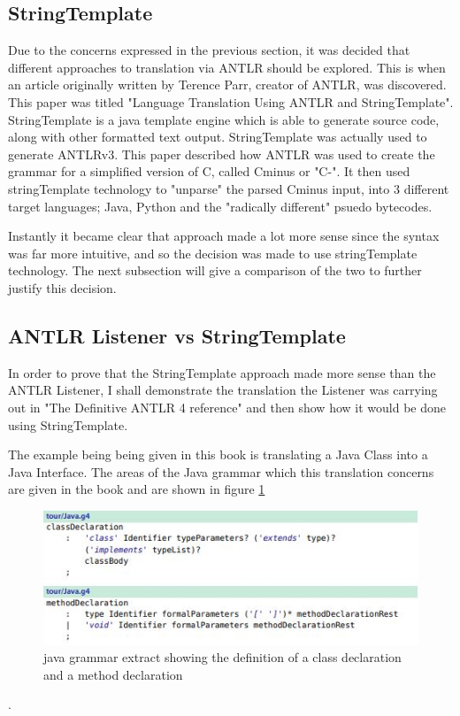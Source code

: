 \documentclass{l4proj}
\begin{document}
\subsection{StringTemplate}
Due to the concerns expressed in the previous section, it was decided that different approaches to translation via ANTLR should be explored. This is when an article originally written by Terence Parr, creator of ANTLR, was discovered. This paper was titled "Language Translation Using ANTLR and StringTemplate". StringTemplate is a java template engine which is able to generate source code, along with other formatted text output. StringTemplate was actually used to generate ANTLRv3. This paper described how ANTLR was used to create the grammar for a simplified version of C, called Cminus or "C-". It then used stringTemplate technology to "unparse" the parsed Cminus input, into 3 different target languages; Java, Python and the "radically different" psuedo bytecodes.

Instantly it became clear that approach made a lot more sense since the syntax was far more intuitive, and so the decision was made to use stringTemplate technology. The next subsection will give a comparison of the two to further justify this decision.

\subsection{ANTLR Listener vs StringTemplate}
In order to prove that the StringTemplate approach made more sense than the ANTLR Listener, I shall demonstrate the translation the Listener was carrying out in "The Definitive ANTLR 4 reference" and then show how it would be done using StringTemplate.

The example being being given in this book is translating a Java Class into a Java Interface. The areas of the Java grammar which this translation concerns are given in the book and are shown in figure \ref{fig:javaGrammarExample}

\begin{figure}[htb]
    \centering
    \includegraphics[width=1\linewidth]{images/javaGrammarExample.JPG}
        \caption{java grammar extract showing the definition of a class declaration and a method declaration
    }
    \label{fig:javaGrammarExample} 
\end{figure}.
\end{document}
